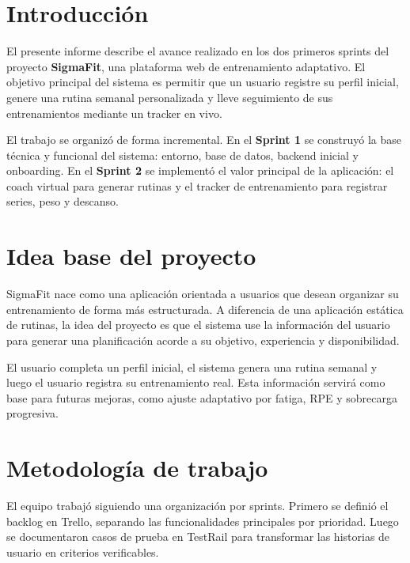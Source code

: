 \documentclass[12pt,a4paper]{article}
\begin{document}
\tableofcontents
\newpage

\section{Introducción}

El presente informe describe el avance realizado en los dos primeros sprints del proyecto \textbf{SigmaFit}, una plataforma web de entrenamiento adaptativo. El objetivo principal del sistema es permitir que un usuario registre su perfil inicial, genere una rutina semanal personalizada y lleve seguimiento de sus entrenamientos mediante un tracker en vivo.

El trabajo se organizó de forma incremental. En el \textbf{Sprint 1} se construyó la base técnica y funcional del sistema: entorno, base de datos, backend inicial y onboarding. En el \textbf{Sprint 2} se implementó el valor principal de la aplicación: el coach virtual para generar rutinas y el tracker de entrenamiento para registrar series, peso y descanso.

\section{Idea base del proyecto}

SigmaFit nace como una aplicación orientada a usuarios que desean organizar su entrenamiento de forma más estructurada. A diferencia de una aplicación estática de rutinas, la idea del proyecto es que el sistema use la información del usuario para generar una planificación acorde a su objetivo, experiencia y disponibilidad.

\begin{tcolorbox}[title=\textbf{Idea central}]
El usuario completa un perfil inicial, el sistema genera una rutina semanal y luego el usuario registra su entrenamiento real. Esta información servirá como base para futuras mejoras, como ajuste adaptativo por fatiga, RPE y sobrecarga progresiva.
\end{tcolorbox}

\section{Metodología de trabajo}

El equipo trabajó siguiendo una organización por sprints. Primero se definió el backlog en Trello, separando las funcionalidades principales por prioridad. Luego se documentaron casos de prueba en TestRail para transformar las historias de usuario en criterios verificables.
\end{document}
